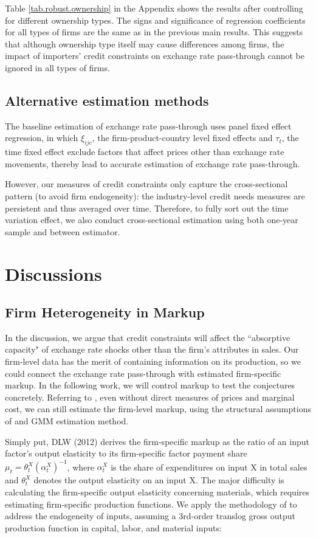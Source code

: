 \documentclass[12pt]{article}
\begin{document}
Table \ref{tab.robust.ownership} in the Appendix shows the results after controlling for different ownership types. The signs and significance of regression coefficients for all types of firms are the same as in the previous main results. This suggests that although ownership type itself may cause differences among firms, the impact of importers' credit constraints on exchange rate pass-through cannot be ignored in all types of firms.

\subsection{Alternative estimation methods}

The baseline estimation of exchange rate pass-through uses panel fixed effect regression, in which $\xi_{ijc}$, the firm-product-country level fixed effects and $\tau_t$, the time fixed effect exclude factors that affect prices other than exchange rate movements, thereby lead to accurate estimation of exchange rate pass-through.

However, our measures of credit constraints only capture the cross-sectional pattern (to avoid firm endogeneity): the industry-level credit needs measures are persistent and thus averaged over time. Therefore, to fully sort out the time variation effect, we also conduct cross-sectional estimation using both one-year sample and between estimator.

\section{Discussions} \label{Discussion}

\subsection{Firm Heterogeneity in Markup}
In the discussion, we argue that credit constraints will affect the ``absorptive capacity" of exchange rate shocks other than the firm's attributes in sales. Our firm-level data has the merit of containing information on its production, so we could connect the exchange rate pass-through with estimated firm-specific markup. In the following work, we will control markup to test the conjectures concretely. Referring to \cite{bkl2021}, even without direct measures of prices and marginal cost, we can still estimate the firm-level markup, using the structural assumptions of \cite{dlw2012} and GMM estimation method.

Simply put, DLW (2012)\cite{dlw2012} derives the firm-specific markup as the ratio of an input factor's output elasticity to its firm-specific factor payment share $\mu_{t}=\theta_{t}^{X}\left(\alpha_{t}^{X}\right)^{-1}$, where $\alpha_{t}^{X}$ is the share of expenditures on input X in total sales and $\theta^X_t$ denotes the output elasticity on an input X. The major difficulty is calculating the firm-specific output elasticity concerning materials, which requires estimating firm-specific production functions. We apply the methodology of \cite{acf2015} to address the endogeneity of inputs, assuming a 3rd-order translog gross output production function in capital, labor, and material inputs:
\end{document}
